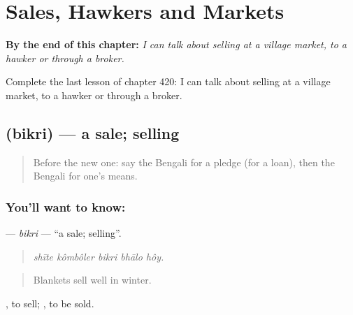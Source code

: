 
\chapter{Sales, Hawkers and Markets}
\label{ch:bn-sales-hawkers-and-markets}

\begin{chapteropening}
\textbf{By the end of this chapter:} \emph{I can talk about selling at a village market, to a hawker or through a broker.}

Complete the last lesson of chapter 420: I can talk about selling at a village market, to a hawker or through a broker.
\end{chapteropening}

\section[\texorpdfstring{\bn{বিক্রি} (bikri)}{বিক্রি (bikri)}]{ (bikri) — a sale; selling}

\label{lesson:BN-C420-bikri}



\begin{quote}
Before the new one: say the Bengali for a pledge (for a loan), then the Bengali for one's means.
\end{quote}

\subsection*{You'll want to know: }
\textbf{} — \emph{bikri} — \textquotedblleft{}a sale; selling\textquotedblright{}.

\begin{quote}
    
\end{quote}

\begin{quote}
\emph{shīte kômbôler bikri bhālo hôy.}
\end{quote}

\begin{quote}
Blankets sell well in winter.
\end{quote}

 , to sell;  , to be sold.

